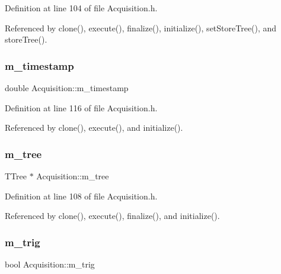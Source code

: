 Definition at line 104 of file Acquisition.\+h.



Referenced by clone(), execute(), finalize(), initialize(), set\+Store\+Tree(), and store\+Tree().

\mbox{\label{classAcquisition_aa88cf8d27e075b5aaddb309dfb42cd04}} 
\subsubsection{\texorpdfstring{m\+\_\+timestamp}{m\_timestamp}}
{\footnotesize\ttfamily double Acquisition\+::m\+\_\+timestamp\hspace{0.3cm}{\ttfamily [private]}}



Definition at line 116 of file Acquisition.\+h.



Referenced by clone(), execute(), and initialize().

\mbox{\label{classAcquisition_aa88a923232e8b7e08f5c1b5411497fc5}} 
\subsubsection{\texorpdfstring{m\+\_\+tree}{m\_tree}}
{\footnotesize\ttfamily T\+Tree $\ast$ Acquisition\+::m\+\_\+tree\hspace{0.3cm}{\ttfamily [private]}}



Definition at line 108 of file Acquisition.\+h.



Referenced by clone(), execute(), finalize(), and initialize().

\mbox{\label{classAcquisition_a953bdc1bf56206b6df33b648af32a24f}} 
\subsubsection{\texorpdfstring{m\+\_\+trig}{m\_trig}}
{\footnotesize\ttfamily bool Acquisition\+::m\+\_\+trig\hspace{0.3cm}{\ttfamily [private]}}



